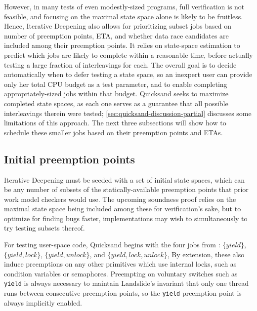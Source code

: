 However, in many tests of even modestly-sized programs,
full verification is not feasible,
and focusing on the maximal state space alone is likely to be fruitless.
%
Hence, Iterative Deepening also allows for prioritizing subset jobs
based on number of preemption points, ETA, and whether data race candidates are included among their preemption points.
It relies on state-space estimation \cite{estimation}
to predict which jobs are likely to complete within a reasonable time,
before actually testing a large fraction of interleavings for each.
The overall goal is to decide automatically when to defer testing a state space,
so an inexpert user can provide only her total CPU budget as a test parameter,
and to enable completing appropriately-sized jobs within that budget.
Quicksand seeks to maximize completed state spaces,
as each one serves as a guarantee that all possible interleavings therein were tested;
\cref{sec:quicksand-discussion-partial} discusses some limitations of this approach.
The next three subsections will show how to schedule these smaller jobs
based on their preemption points and ETAs.


\subsection{Initial preemption points}
\label{sec:quicksand-initial-pps}

Iterative Deepening must be seeded with a set of initial state spaces,
which can be any number of subsets of the statically-available preemption points
that prior work model checkers would use.
The upcoming soundness proof relies on the maximal state space being included among these for verification's sake,
but to optimize for finding bugs faster,
implementations may wish to simultaneously to try testing subsets thereof.

For testing user-space code, Quicksand begins with the four jobs from :
$\{yield\}$,
$\{yield,lock\}$,
$\{yield,unlock\}$,
and $\{yield,lock,unlock\}$,
By extension, these also induce preemptions on any other primitives
which use
internal locks,
such as condition variables or semaphores.
Preempting on voluntary switches such as {\tt yield} is always necessary to maintain
Landslide's invariant that only one thread runs between consecutive preemption points,
so the {\tt yield} preemption point is always implicitly enabled.

